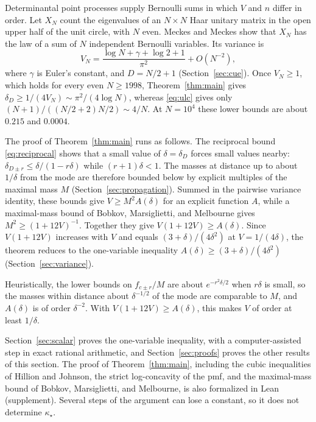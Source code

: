 \documentclass[ECP]{ejpecp}
\begin{document}
\begin{example}\label{ex:cue}
  Determinantal point processes supply Bernoulli sums in which $V$ and $n$
  differ in order. Let $X_N$ count the eigenvalues of an $N\times N$ Haar unitary matrix in
  the open upper half of the unit circle, with $N$ even. Meckes and Meckes
  \cite[Proposition~3(1)]{meckesmeckes2017} show that $X_N$ has the law of a
  sum of $N$ independent Bernoulli variables. Its variance is
  \[
    V_N=\frac{\log N+\gamma+\log2+1}{\pi^2}+O(N^{-2}),
  \]
  where $\gamma$ is Euler's constant, and $D=N/2+1$
  (Section~\ref{sec:cue}). Once $V_N\geq1$, which holds for every even
  $N\geq1998$, Theorem~\ref{thm:main} gives
  $\delta_D\geq1/(4V_N)\sim\pi^2/(4\log N)$, whereas \eqref{eq:ulc} gives
  only $(N+1)/((N/2+2)N/2)\sim4/N$. At $N=10^4$ these lower bounds are about
  $0.215$ and $0.0004$.
\end{example}

The proof of Theorem~\ref{thm:main} runs as follows. The reciprocal bound
\eqref{eq:reciprocal} shows that a small value of $\delta=\delta_D$ forces
small values nearby:
$\delta_{D\pm r}\leq\delta/(1-r\delta)$ while $(r+1)\delta<1$. The masses at distance up to about
$1/\delta$ from the mode are therefore bounded below by explicit multiples of
the maximal mass $M$ (Section~\ref{sec:propagation}). Summed in the pairwise
variance identity, these bounds give $V\geq M^2A(\delta)$ for an explicit
function $A$, while a maximal-mass bound of Bobkov, Marsiglietti, and
Melbourne gives $M^2\geq(1+12V)^{-1}$. Together they give
$V(1+12V)\geq A(\delta)$. Since $V(1+12V)$ increases with $V$ and equals
$(3+\delta)/(4\delta^2)$ at $V=1/(4\delta)$, the theorem reduces to the
one-variable inequality $A(\delta)\geq(3+\delta)/(4\delta^2)$
(Section~\ref{sec:variance}).

Heuristically, the lower bounds on $f_{c\pm r}/M$ are about
$e^{-r^2\delta/2}$ when $r\delta$ is small, so the masses within distance
about $\delta^{-1/2}$ of the mode are comparable to $M$, and $A(\delta)$ is
of order $\delta^{-2}$. With $V(1+12V)\geq A(\delta)$, this makes $V$ of
order at least $1/\delta$.

Section~\ref{sec:scalar} proves the one-variable inequality, with a
computer-assisted step in exact rational arithmetic, and
Section~\ref{sec:proofs} proves the other results of this section. The proof
of Theorem~\ref{thm:main}, including the cubic inequalities of Hillion and
Johnson, the strict log-concavity of the pmf, and the maximal-mass bound of
Bobkov, Marsiglietti, and Melbourne, is also formalized in Lean
(supplement). Several steps of the argument can lose a constant, so it does
not determine $\kappa_\star$.
\end{document}
